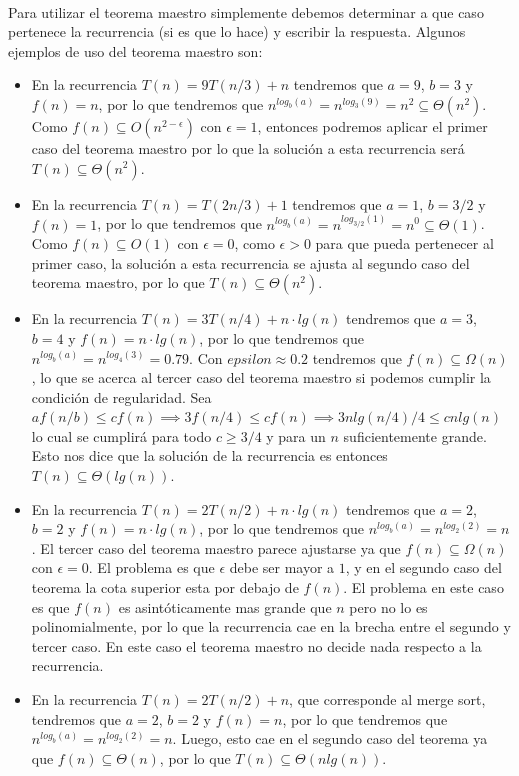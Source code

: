 \documentclass[10pt, a4paper]{report}
\begin{document}
~

Para utilizar el teorema maestro simplemente debemos determinar a que caso pertenece la recurrencia (si es que lo hace) y escribir la respuesta. Algunos ejemplos de uso del teorema maestro son:

\begin{itemize}
 \item En la recurrencia $T(n) = 9T(n/3) + n$ tendremos que $a=9$, $b=3$ y $f(n)=n$, por lo que tendremos que $n^{log_b(a)} = n^{log_3(9)} = n^2 \subseteq \Theta(n^2)$. Como $f(n) \subseteq O(n^{2-\epsilon})$ con $\epsilon = 1$, entonces podremos aplicar el primer caso del teorema maestro por lo que la soluci\'on a esta recurrencia ser\'a $T(n) \subseteq \Theta(n^2)$.
 
 \item En la recurrencia $T(n) = T(2n/3) + 1$ tendremos que $a=1$, $b=3/2$ y $f(n) = 1$, por lo que tendremos que $n^{log_b(a)} = n^{log_{3/2}(1)} = n^0 \subseteq \Theta(1)$. Como $f(n) \subseteq O(1)$ con $\epsilon = 0$, como $\epsilon > 0$ para que pueda pertenecer al primer caso, la soluci\'on a esta recurrencia se ajusta al segundo caso del teorema maestro, por lo que $T(n) \subseteq \Theta(n^2)$.
 
 \item En la recurrencia $T(n) = 3T(n/4) + n \cdot lg(n)$ tendremos que $a=3$, $b=4$ y $f(n) = n \cdot lg(n)$, por lo que tendremos que $n^{log_b(a)} = n^{log_4(3)} = 0.79$. Con $epsilon \approx 0.2$ tendremos que $f(n) \subseteq \Omega(n)$, lo que se acerca al tercer caso del teorema maestro si podemos cumplir la condici\'on de regularidad. Sea $af(n/b) \leq cf(n) \implies 3f(n/4) \leq cf(n) \implies 3nlg(n/4)/4 \leq cnlg(n)$ lo cual se cumplir\'a para todo $c \geq 3/4$ y para un $n$ suficientemente grande. Esto nos dice que la soluci\'on de la recurrencia es entonces $T(n) \subseteq \Theta(lg(n))$.
 
 \item En la recurrencia $T(n) = 2T(n/2) + n \cdot lg(n)$ tendremos que $a=2$, $b=2$ y $f(n) = n \cdot lg(n)$, por lo que tendremos que $n^{log_b(a)} = n^{log_2(2)} = n$. El tercer caso del teorema maestro parece ajustarse ya que $f(n) \subseteq \Omega(n)$ con $\epsilon = 0$. El problema es que $\epsilon$ debe ser mayor a $1$, y en el segundo caso del teorema la cota superior esta por debajo de $f(n)$. El problema en este caso es que $f(n)$ es asint\'oticamente mas grande que $n$ pero no lo es polinomialmente, por lo que la recurrencia cae en la brecha entre el segundo y tercer caso. En este caso el teorema maestro no decide nada respecto a la recurrencia.
 
 \item En la recurrencia $T(n) = 2T(n/2) + n$, que corresponde al merge sort, tendremos que $a=2$, $b=2$ y $f(n) = n$, por lo que tendremos que $n^{log_b(a)} = n^{log_2(2)} = n$. Luego, esto cae en el segundo caso del teorema ya que $f(n) \subseteq \Theta(n)$, por lo que $T(n) \subseteq \Theta(nlg(n))$.
\end{itemize}
\end{document}

